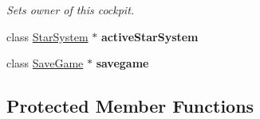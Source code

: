 \begin{DoxyCompactItemize}
\begin{DoxyCompactList}\small\item\em Sets owner of this cockpit. \end{DoxyCompactList}\item 
class \hyperlink{classStarSystem}{Star\+System} $\ast$ {\bfseries active\+Star\+System}\hypertarget{classCockpit_a8dbefe60276613268c8c9b25b8851829}{}\label{classCockpit_a8dbefe60276613268c8c9b25b8851829}

\item 
class \hyperlink{classSaveGame}{Save\+Game} $\ast$ {\bfseries savegame}\hypertarget{classCockpit_ac03d766ee2a98e3f38df75e447cf1c12}{}\label{classCockpit_ac03d766ee2a98e3f38df75e447cf1c12}

\end{DoxyCompactItemize}
\subsection*{Protected Member Functions}
